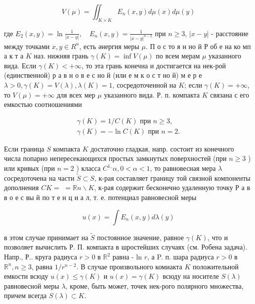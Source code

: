 \documentclass[10pt]{article}
\begin{document}
\[

V(\mu)=\iint_{K \times K} E_{n}(x, y) d \mu(x) d \mu(y)

\]



где $E_{2}(x, y)=\ln \frac{1}{|x-y|}, \quad E_{n}(x, y)=\frac{1}{|x-y|^{n-2}}$ при $n \geqslant 3$, $|x-y|$ - расстояние между точками $x, y \in R^{n}$, есть әнергия меры $\mu$. П о с то я н но й Р об е на ко мп а к т а $K$ наз. нижняя грань $\gamma(K)=\inf V(\mu)$ по всем мерам $\mu$ указанного вида. Если $\gamma(K)<+\infty$, то эта грань конечна и достигается на нек-рой (единственной) р а в н о в е с но й (или е м к о с т но й) м е р е $\lambda>0, \gamma(K)=V(\lambda), \lambda(K)=1$, сосредоточенной на $K$; если $\gamma(K)=+\infty$, то $V(\mu)=+\infty$ для всех мер $\mu$ указанного вида. Р. п. компакта $K$ связана с его емкостью соотношениями



\[

\begin{gathered}

\gamma(K)=1 / C(K) \text { при } n \geqslant 3, \\

\gamma(K)=-\ln C(K) \text { при } n=2 .

\end{gathered}

\]



Если граница $S$ компакта $K$ достаточно гладкая, напр. состоит из конечного числа попарно непересекающихся простых замкнутых поверхностей (при $n \geqslant 3$ ) или кривых (при $n=2$ ) класса $C^{1,} \alpha, 0<\alpha<1$, то равновесная мера $\lambda$ сосредоточена на части $\tilde{S} \subset S$, к-рая составляет границу той связной компоненты дополнения $C K=$ $=\mathbb{R} n \backslash K$, к-рая содержит бесконечно удаленную точку Р а в в о е с вы й по т е н ц и а л, т. е. потенциал равновесной меры



\[

u(x)=\int E_{n}(x, y) d \lambda(y)

\]



в этом случае принимает на $\tilde{S}$ постоянное значение, равное $\gamma(K)$, что и позволяет вычислить Р. П. компакта в шростейших случаях (см. Робена задача). Напр., Р.. круга радиуса $r>0$ в $\mathbb{R}^{2}$ равна - ln $r$, а P. п. шара радиуса $r>0$ в $\mathbb{R}^{n}, n \geqslant 3$, равна $1 / r^{n-2}$. В случае произвольного комиакта $K$ положительной емкости всюду $u(x) \leqslant \gamma(K)$ и $u(x)=\gamma(K)$ всюду на носителе $S(\lambda)$ равновесной меры $\lambda$, кроме, быть может, точек нек-рого полярного множества, причем всегда $S(\lambda) \subset K$.
\end{document}
